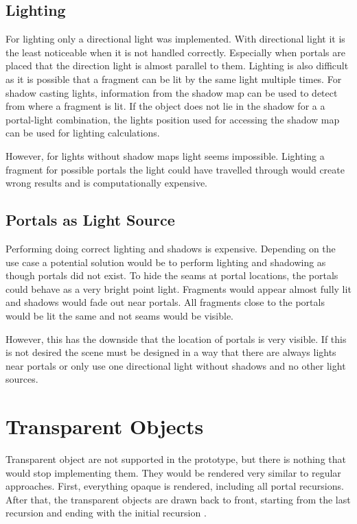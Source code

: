 \subsection{Lighting}
For lighting only a directional light was implemented. With directional light it is the least noticeable when it is not handled correctly. Especially when portals are placed that the direction light is almost parallel to them.
Lighting is also difficult as it is possible that a fragment can be lit by the same light multiple times. For shadow casting lights, information from the shadow map can be used to detect from where a fragment is lit. If the object does not lie in the shadow for a a portal-light combination, the lights position used for accessing the shadow map can be used for lighting calculations.

However, for lights without shadow maps light seems impossible. Lighting a fragment for possible portals the light could have travelled through would create wrong results and is computationally expensive. 


\subsection{Portals as Light Source}
\label{section:portalsaslights}
Performing doing correct lighting and shadows is expensive. Depending on the use case a potential solution would be to perform lighting and shadowing as though portals did not exist. To hide the seams at portal locations, the portals could behave as a very bright point light. Fragments would appear almost fully lit and shadows would fade out near portals. All fragments close to the portals would be lit the same and not seams would be visible.

However, this has the downside that the location of portals is very visible. If this is not desired the scene must be designed in a way that there are always lights near portals or only use one directional light without shadows and no other light sources.


\section{Transparent Objects}
Transparent object are not supported in the prototype, but there is nothing that would stop implementing them. They would be rendered very similar to regular approaches. First, everything opaque is rendered, including all portal recursions. After that, the transparent objects are drawn back to front, starting from the last recursion and ending with the initial recursion \cite{lecture:portalProblems}.

